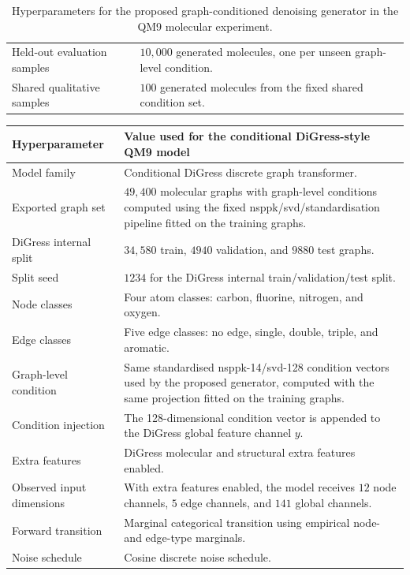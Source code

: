 \begin{table}[p]
\begin{tabularx}{\textwidth}{@{}p{}X@{}}
Held-out evaluation samples & \(10{,}000\) generated molecules, one per unseen graph-level condition. \\
Shared qualitative samples & \(100\) generated molecules from the fixed shared condition set. \\
\bottomrule
\end{tabularx}
\caption{Hyperparameters for the proposed graph-conditioned denoising generator in the QM9 molecular experiment.}
\label{tab:qm9-proposed-generator-hyperparameters}
\end{table}

\begin{table}[p]
\centering
\footnotesize
\begin{tabularx}{\textwidth}{@{}p{}X@{}}
\toprule
Hyperparameter & Value used for the conditional DiGress-style QM9 model \\
\midrule
Model family & Conditional DiGress discrete graph transformer. \\
Exported graph set & \(49{,}400\) molecular graphs with graph-level conditions computed using the fixed \gls{nsppk}/\gls{svd}/standardisation pipeline fitted on the training graphs. \\
DiGress internal split & \(34{,}580\) train, \(4940\) validation, and \(9880\) test graphs. \\
Split seed & \(1234\) for the DiGress internal train/validation/test split. \\
Node classes & Four atom classes: carbon, fluorine, nitrogen, and oxygen. \\
Edge classes & Five edge classes: no edge, single, double, triple, and aromatic. \\
Graph-level condition & Same standardised \gls{nsppk}-14/\gls{svd}-128 condition vectors used by the proposed generator, computed with the same projection fitted on the training graphs. \\
Condition injection & The 128-dimensional condition vector is appended to the DiGress global feature channel \(y\). \\
Extra features & DiGress molecular and structural extra features enabled. \\
Observed input dimensions & With extra features enabled, the model receives \(12\) node channels, \(5\) edge channels, and \(141\) global channels. \\
Forward transition & Marginal categorical transition using empirical node- and edge-type marginals. \\
Noise schedule & Cosine discrete noise schedule. \\

\end{tabularx}
\end{table}
